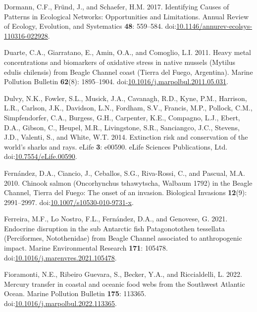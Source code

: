 \documentclass[
]{article}
\newlength{\cslhangindent}
\newenvironment{CSLReferences}[2] %
 {\begin{list}{}{%
  \setlength{\itemindent}{0pt}
  \setlength{\leftmargin}{0pt}
  \setlength{\parsep}{0pt}
  \ifodd #1
   \setlength{\leftmargin}{\cslhangindent}
   \setlength{\itemindent}{-1\cslhangindent}
  \fi
  \setlength{\itemsep}{#2\baselineskip}}}
 {\end{list}}
\begin{document}
\begin{CSLReferences}{1}{0}
Dormann, C.F., Fründ, J., and Schaefer, H.M. 2017. Identifying {Causes}
of {Patterns} in {Ecological Networks}: {Opportunities} and
{Limitations}. Annual Review of Ecology, Evolution, and Systematics
\textbf{48}: 559--584.
doi:\href{https://doi.org/10.1146/annurev-ecolsys-110316-022928}{10.1146/annurev-ecolsys-110316-022928}.

Duarte, C.A., Giarratano, E., Amin, O.A., and Comoglio, L.I. 2011. Heavy
metal concentrations and biomarkers of oxidative stress in native
mussels ({Mytilus} edulis chilensis) from {Beagle Channel} coast
({Tierra} del {Fuego}, {Argentina}). Marine Pollution Bulletin
\textbf{62}(8): 1895--1904.
doi:\href{https://doi.org/10.1016/j.marpolbul.2011.05.031}{10.1016/j.marpolbul.2011.05.031}.

Dulvy, N.K., Fowler, S.L., Musick, J.A., Cavanagh, R.D., Kyne, P.M.,
Harrison, L.R., Carlson, J.K., Davidson, L.N., Fordham, S.V., Francis,
M.P., Pollock, C.M., Simpfendorfer, C.A., Burgess, G.H., Carpenter,
K.E., Compagno, L.J., Ebert, D.A., Gibson, C., Heupel, M.R.,
Livingstone, S.R., Sanciangco, J.C., Stevens, J.D., Valenti, S., and
White, W.T. 2014. Extinction risk and conservation of the world's sharks
and rays. eLife \textbf{3}: e00590. eLife Sciences Publications, Ltd.
doi:\href{https://doi.org/10.7554/eLife.00590}{10.7554/eLife.00590}.

Fernández, D.A., Ciancio, J., Ceballos, S.G., Riva-Rossi, C., and
Pascual, M.A. 2010. Chinook salmon ({Oncorhynchus} tshawytscha,
{Walbaum} 1792) in the {Beagle Channel}, {Tierra} del {Fuego}: The onset
of an invasion. Biological Invasions \textbf{12}(9): 2991--2997.
doi:\href{https://doi.org/10.1007/s10530-010-9731-x}{10.1007/s10530-010-9731-x}.

Ferreira, M.F., Lo Nostro, F.L., Fernández, D.A., and Genovese, G. 2021.
Endocrine disruption in the sub {Antarctic} fish {Patagonotothen}
tessellata ({Perciformes}, {Notothenidae}) from {Beagle Channel}
associated to anthropogenic impact. Marine Environmental Research
\textbf{171}: 105478.
doi:\href{https://doi.org/10.1016/j.marenvres.2021.105478}{10.1016/j.marenvres.2021.105478}.

Fioramonti, N.E., Ribeiro Guevara, S., Becker, Y.A., and Riccialdelli,
L. 2022. Mercury transfer in coastal and oceanic food webs from the
{Southwest Atlantic Ocean}. Marine Pollution Bulletin \textbf{175}:
113365.
doi:\href{https://doi.org/10.1016/j.marpolbul.2022.113365}{10.1016/j.marpolbul.2022.113365}.


\end{CSLReferences}
\end{document}
